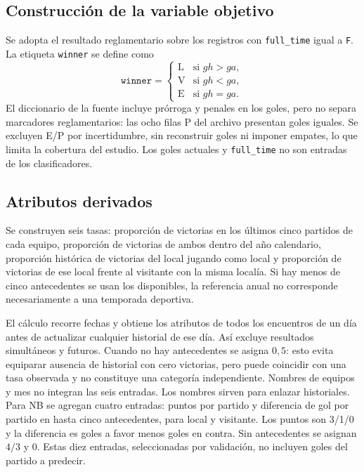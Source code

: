 \documentclass[conference]{IEEEtran}
\begin{document}
\subsection{Construcción de la variable objetivo}
Se adopta el resultado reglamentario sobre los registros con \texttt{full\_time} igual a \texttt{F}. La etiqueta \texttt{winner} se define como
\[
\texttt{winner} =
\begin{cases}
\text{L} & \text{si } gh>ga,\\
\text{V} & \text{si } gh<ga,\\
\text{E} & \text{si } gh=ga.
\end{cases}
\]
El diccionario de la fuente incluye prórroga y penales en los goles\cite{b1}, pero no separa marcadores reglamentarios: las ocho filas P del archivo presentan goles iguales. Se excluyen E/P por incertidumbre, sin reconstruir goles ni imponer empates, lo que limita la cobertura del estudio. Los goles actuales y \texttt{full\_time} no son entradas de los clasificadores.

\subsection{Atributos derivados}
Se construyen seis tasas: proporción de victorias en los últimos cinco partidos de cada equipo, proporción de victorias de ambos dentro del año calendario, proporción histórica de victorias del local jugando como local y proporción de victorias de ese local frente al visitante con la misma localía. Si hay menos de cinco antecedentes se usan los disponibles, la referencia anual no corresponde necesariamente a una temporada deportiva.

El cálculo recorre fechas y obtiene los atributos de todos los encuentros de un día antes de actualizar cualquier historial de ese día. Así excluye resultados simultáneos y futuros. Cuando no hay antecedentes se asigna $0{,}5$: esto evita equiparar ausencia de historial con cero victorias, pero puede coincidir con una tasa observada y no constituye una categoría independiente. Nombres de equipos y mes no integran las seis entradas. Los nombres sirven para enlazar historiales. Para NB se agregan cuatro entradas: puntos por partido y diferencia de gol por partido en hasta cinco antecedentes, para local y visitante. Los puntos son 3/1/0 y la diferencia es goles a favor menos goles en contra. Sin antecedentes se asignan $4/3$ y 0. Estas diez entradas, seleccionadas por validación, no incluyen goles del partido a predecir.
\end{document}
